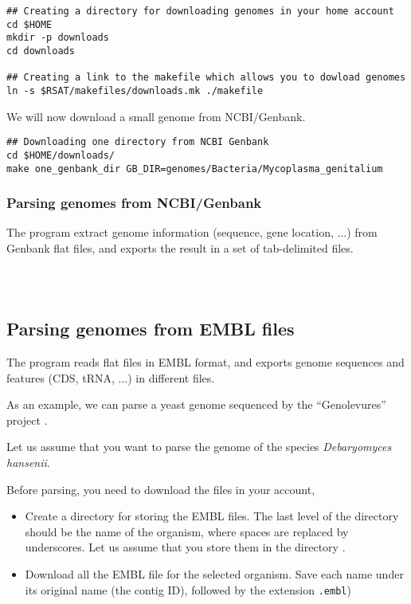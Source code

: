 \begin{verbatim}
## Creating a directory for downloading genomes in your home account
cd $HOME
mkdir -p downloads
cd downloads

## Creating a link to the makefile which allows you to dowload genomes
ln -s $RSAT/makefiles/downloads.mk ./makefile
\end{verbatim}

We will now download a small genome from NCBI/Genbank. 

\begin{verbatim}
## Downloading one directory from NCBI Genbank
cd $HOME/downloads/
make one_genbank_dir GB_DIR=genomes/Bacteria/Mycoplasma_genitalium
\end{verbatim}


\subsubsection{Parsing genomes from NCBI/Genbank}

The program  extract genome information
(sequence, gene location, ...) from Genbank flat files, and exports
the result in a set of tab-delimited files.

\begin{verbatim}



\end{verbatim}


\subsection{Parsing genomes from EMBL files}

The program  reads flat files in EMBL format,
and exports genome sequences and features (CDS, tRNA, ...) in
different files.

As an example, we can parse a yeast genome sequenced by the
``Genolevures'' project
.

Let us assume that you want to parse the genome of the species
\textit{Debaryomyces hansenii}.

Before parsing, you need to download the files in your account, 

\begin{itemize}
\item Create a directory for storing the EMBL files. The last level of
  the directory should be the name of the organism, where spaces are
  replaced by underscores. Let us assume that you store them in
  the directory .

\item Download all the EMBL file for the selected organism. Save each
  name under its original name (the contig ID), followed by the
  extension \texttt{.embl})

\end{itemize}

